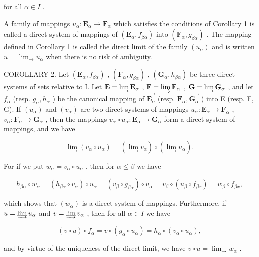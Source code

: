 for all \(\alpha \in I\) .

A family of mappings \(u_{\alpha} \colon \mathbf{E}_{\alpha} \to \mathbf{F}_{\alpha}\) which satisfies the conditions of Corollary 1 is called a direct system of mappings of \((\mathbf{E}_{\alpha}, f_{\beta \alpha})\) into \((\mathbf{F}_{\alpha}, g_{\beta \alpha})\) . The mapping defined in Corollary 1 is called the direct limit of the family \((u_{\alpha})\) and is written \(u = \lim_{\rightarrow} u_{\alpha}\) when there is no risk of ambiguity.

COROLLARY 2. Let \((\mathbf{E}_{\alpha}, f_{\beta \alpha})\) , \((\mathbf{F}_{\alpha}, g_{\beta \alpha})\) , \((\mathbf{G}_{\alpha}, h_{\beta \alpha})\) be three direct systems of sets relative to I. Let \(\mathbf{E} = \varinjlim \mathbf{E}_{\alpha}\) , \(\mathbf{F} = \varinjlim \mathbf{F}_{\alpha}\) , \(\mathbf{G} = \varinjlim \mathbf{G}_{\alpha}\) , and let \(f_{\alpha}\) (resp. \(g_{\alpha}, h_{\alpha}\) ) be the canonical mapping of \(\overrightarrow{\mathbf{E}_{\alpha}}\) (resp. \(\mathbf{F}_{\alpha}, \overrightarrow{\mathbf{G}_{\alpha}}\) ) into E (resp. F, G). If \((u_{\alpha})\) and \((v_{\alpha})\) are two direct systems of mappings \(u_{\alpha}: \mathbf{E}_{\alpha} \to \mathbf{F}_{\alpha}\) , \(v_{\alpha}: \mathbf{F}_{\alpha} \to \mathbf{G}_{\alpha}\) , then the mappings \(v_{\alpha} \circ u_{\alpha}: \mathbf{E}_{\alpha} \to \mathbf{G}_{\alpha}\) form a direct system of mappings, and we have

\[
\lim _ {\rightarrow} \left(v _ {\alpha} \circ u _ {\alpha}\right) = (\lim _ {\rightarrow} v _ {\alpha}) \circ (\lim _ {\rightarrow} u _ {\alpha}).\tag{25}
\]

For if we put \(w_{\alpha} = v_{\alpha} \circ u_{\alpha}\) , then for \(\alpha \leqslant \beta\) we have

\[
h _ {\beta \alpha} \circ w _ {\alpha} = \left(h _ {\beta \alpha} \circ v _ {\alpha}\right) \circ u _ {\alpha} = \left(v _ {\beta} \circ g _ {\beta \alpha}\right) \circ u _ {\alpha} = v _ {\beta} \circ \left(u _ {\beta} \circ f _ {\beta x}\right) = w _ {\beta} \circ f _ {\beta x},
\]

which shows that \((w_{\alpha})\) is a direct system of mappings. Furthermore, if \(u = \varinjlim u_{\alpha}\) and \(v = \varinjlim v_{\alpha}\) , then for all \(\alpha \in I\) we have

\[
(v \circ u) \circ f _ {\alpha} = v \circ (g _ {\alpha} \circ u _ {\alpha}) = h _ {\alpha} \circ (v _ {\alpha} \circ u _ {\alpha}),
\]

and by virtue of the uniqueness of the direct limit, we have \(v \circ u = \lim_{\rightarrow} w_{\alpha}\) .

